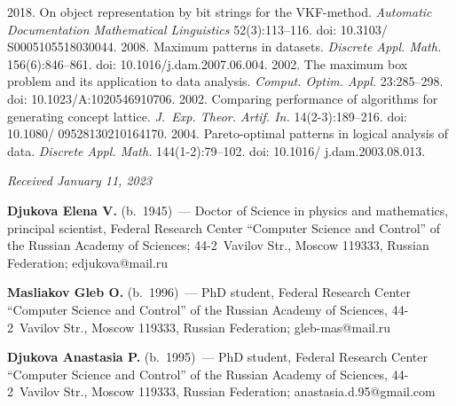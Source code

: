 \begin{multicols}{2}
{{\begin{thebibliography}{99}
 2018. On object representation by bit strings for the VKF-method. 
\textit{Automatic Documentation Mathematical Linguistics} 52(3):113--116. doi: 
10.3103/ S0005105518030044.
 2008. Maximum patterns in datasets. 
\textit{Discrete Appl. Math.} 156(6):846--861. doi: 10.1016/j.dam.2007.06.004.
 2002. The maximum 
box problem and its application to data analysis. \textit{Comput. Optim. Appl.} 23:285--298. doi: 
10.1023/A:1020546910706.
 2002. Comparing performance of algorithms for 
generating concept lattice. \textit{J.~Exp. Theor. Artif. In.} 14(2-3):189--216. doi: 
10.1080/ 09528130210164170.
2004. Pareto-optimal patterns in logical analysis of data. \textit{Discrete Appl. Math.} 
 144(1-2):79--102. doi: 10.1016/ j.dam.2003.08.013.
 \end{thebibliography}

 }
 }

\end{multicols}

\vspace*{-6pt}

\hfill{\small\textit{Received January 11, 2023}} 

\vspace*{-12pt}

\Contr

\noindent
\textbf{Djukova Elena V.} (b.\ 1945)~--- Doctor of Science in physics and mathematics, principal 
scientist, Federal Research Center ``Computer Science and Control'' of the Russian Academy of 
Sciences; 44-2~Vavilov Str., Moscow 119333, Russian Federation; \mbox{edjukova@mail.ru}

\vspace*{3pt}

\noindent
\textbf{Masliakov Gleb O.} (b.\ 1996)~--- PhD student, Federal Research Center ``Computer 
Science and Control'' of the Russian Academy of Sciences, 44-2~Vavilov Str., Moscow 119333, 
Russian Federation; \mbox{gleb-mas@mail.ru}


\vspace*{3pt}

\noindent
\textbf{Djukova Anastasia P.} (b.\ 1995)~--- PhD student, Federal Research Center ``Computer 
Science and Control'' of the Russian Academy of Sciences, 44-2~Vavilov Str., Moscow 119333, 
Russian Federation; \mbox{anastasia.d.95@gmail.com}



\label{end\stat}

\renewcommand{\bibname}{\protect\rm Литература} 